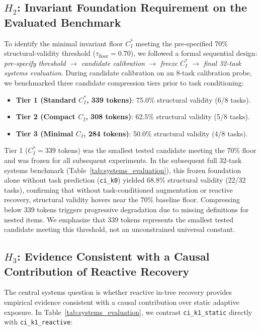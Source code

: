 \subsection{$H_2$: Invariant Foundation Requirement on the Evaluated Benchmark}
To identify the minimal invariant floor $C_I^*$ meeting the pre-specified 70\% structural-validity threshold ($\tau_{\text{floor}} = 0.70$), we followed a formal sequential design: \textit{pre-specify threshold} $\rightarrow$ \textit{candidate calibration} $\rightarrow$ \textit{freeze $C_I^*$} $\rightarrow$ \textit{final 32-task systems evaluation}.
During candidate calibration on an 8-task calibration probe, we benchmarked three candidate compression tiers prior to task conditioning:
\begin{itemize}
    \item \textbf{Tier 1 (Standard $C_I^*$, 339 tokens)}: 75.0\% structural validity (6/8 tasks).
    \item \textbf{Tier 2 (Compact $C_I$, 308 tokens)}: 62.5\% structural validity (5/8 tasks).
    \item \textbf{Tier 3 (Minimal $C_I$, 284 tokens)}: 50.0\% structural validity (4/8 tasks).
\end{itemize}
Tier 1 ($C_I^* = 339$ tokens) was the smallest tested candidate meeting the 70\% floor and was frozen for all subsequent experiments.
In the subsequent full 32-task systems benchmark (Table~\ref{tab:systems_evaluation}), this frozen foundation alone without task prediction (\texttt{ci\_k0}) yielded 68.8\% structural validity (22/32 tasks), confirming that without task-conditioned augmentation or reactive recovery, structural validity hovers near the 70\% baseline floor. Compressing below 339 tokens triggers progressive degradation due to missing definitions for nested items. We emphasize that 339 tokens represents the smallest tested candidate meeting this threshold, not an unconstrained universal constant.

\subsection{$H_3$: Evidence Consistent with a Causal Contribution of Reactive Recovery}

The central systems question is whether reactive in-tree recovery provides empirical evidence consistent with a causal contribution over static adaptive exposure. In Table~\ref{tab:systems_evaluation}, we contrast \texttt{ci\_k1\_static} directly with \texttt{ci\_k1\_reactive}:

